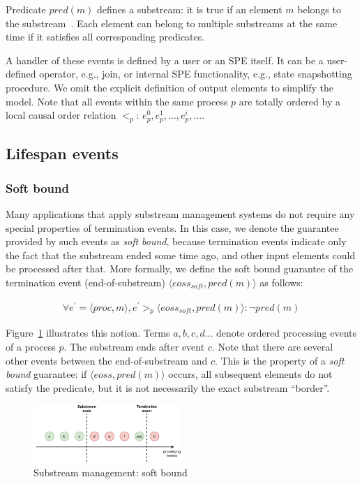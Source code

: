 Predicate $pred(m)$ defines a substream: it is true if an element $m$ belongs to the substream~\cite{Tucker:2003:EPS:776752.776780}. Each element can belong to multiple substreams at the same time if it satisfies all corresponding predicates. 

A handler of these events is defined by a user or an SPE itself. It can be a user-defined operator, e.g., join, or internal SPE functionality, e.g., state snapshotting procedure. We omit the explicit definition of output elements to simplify the model. Note that all events within the same process $p$ are totally ordered by a local causal order relation $<_p$: $e^{0}_p,e^{1}_p,...,e^{i}_p,...$.

\subsection{Lifespan events}

\subsubsection{Soft bound}

Many applications that apply substream management systems do not require any special properties of termination events. In this case, we denote the guarantee provided by such events as {\em soft bound}, because termination events indicate only the fact that the substream ended some time ago, and other input elements could be processed after that. More formally, we define the soft bound guarantee of the termination event (end-of-substream) $\langle eoss_{soft}, pred(m)\rangle$ as follows:

\begin{align*}
\forall e^{'} = \langle proc,m\rangle, e^{'} >_p \langle eoss_{soft}, pred(m)\rangle : \neg pred(m)
\end{align*}

Figure~\ref{general_guarantees} illustrates this notion. Terms $a,b,c,d...$ denote ordered processing events of a process $p$. The substream ends after event $c$. Note that there are several other events between the end-of-substream and $c$. This is the property of a {\em soft bound} guarantee: if $\langle eoss, pred(m)\rangle$ occurs, all subsequent elements do not satisfy the predicate, but it is not necessarily the exact substream ``border''.

\begin{figure}[htbp]
  \centering
  \includegraphics[width=0.50\textwidth]{pics/general-guarantee.pdf}
  \caption{Substream management: soft bound}
  \label{general_guarantees}
\end{figure}


